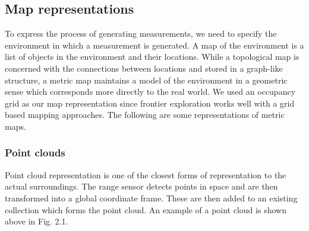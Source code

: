 \subsection{Map representations}
To express the process of generating measurements, we need to specify the environment in which a measurement is generated. A map of the environment is a list of objects in the environment and their locations. While a topological map is concerned with the connections between locations and stored in a graph-like structure, a metric map maintains a model of the environment in a geometric sense which corresponds more directly to the real world. We used an occupancy grid as our map representation since frontier exploration works well with a grid based mapping approaches. The following are some representations of metric maps.

\subsubsection{Point clouds}
Point cloud representation is one of the closest forms of representation to the actual surroundings. The range sensor detects points in space and are then transformed into a global coordinate frame. These are then added to an existing collection which forms the point cloud. An example of a point cloud is shown above in Fig. 2.1.  

